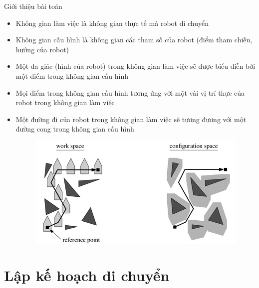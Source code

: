 \documentclass[compress]{beamer}
\begin{document}
\begin{frame}{Giới thiệu bài toán}
\begin{itemize}
\item Không gian làm việc là không gian thực tế mà robot di chuyển 
\item Không gian cấu hình là không gian các tham số của robot (điểm tham chiếu, hướng của robot)
\item Một đa giác (hình của robot) trong không gian làm việc sẽ được biểu diễn bởi một điểm trong không gian cấu hình 
\item Mọi điểm trong không gian cấu hình tương ứng với một vài vị trí thực của robot trong không gian làm việc
\item Một đường đi của robot trong không gian làm việc sẽ tương đương với một đường cong trong không gian cấu hình
\begin{figure}[H]
\centering
\includegraphics[scale=0.45]{path.png}
\end{figure}
\end{itemize}
\end{frame}


\section{Lập kế hoạch di chuyển}
\end{document}

